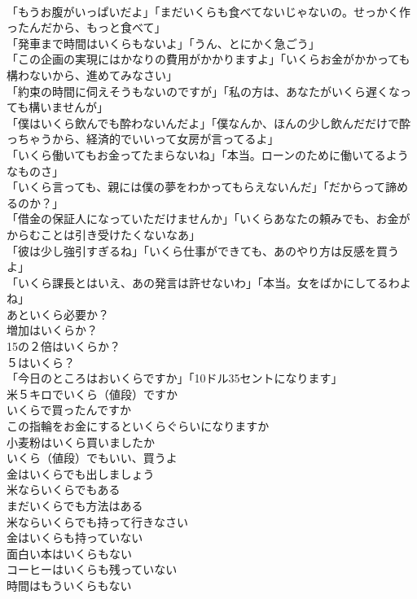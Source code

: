 \documentclass[8pt]{extreport}
\begin{document}
\begin{CJK}{UTF8}{min}
\\	「もうお腹がいっぱいだよ」「まだいくらも食べてないじゃないの。せっかく作ったんだから、もっと食べて」 
\\	「発車まで時間はいくらもないよ」「うん、とにかく急ごう」 
\\	「この企画の実現にはかなりの費用がかかりますよ」「いくらお金がかかっても構わないから、進めてみなさい」 
\\	「約束の時間に伺えそうもないのですが」「私の方は、あなたがいくら遅くなっても構いませんが」 
\\	「僕はいくら飲んでも酔わないんだよ」「僕なんか、ほんの少し飲んだだけで酔っちゃうから、経済的でいいって女房が言ってるよ」 
\\	「いくら働いてもお金ってたまらないね」「本当。ローンのために働いてるようなものさ」 
\\	「いくら言っても、親には僕の夢をわかってもらえないんだ」「だからって諦めるのか？」 
\\	「借金の保証人になっていただけませんか」「いくらあなたの頼みでも、お金がからむことは引き受けたくないなあ」 
\\	「彼は少し強引すぎるね」「いくら仕事ができても、あのやり方は反感を買うよ」 
\\	「いくら課長とはいえ、あの発言は許せないわ」「本当。女をばかにしてるわよね」 
\\	あといくら必要か？ 
\\	増加はいくらか？ 
\\	15の２倍はいくらか？ 
\\	５はいくら？ 
\\	「今日のところはおいくらですか」「10ドル35セントになります」 
\\	米５キロでいくら（値段）ですか 
\\	いくらで買ったんですか 
\\	この指輪をお金にするといくらぐらいになりますか 
\\	小麦粉はいくら買いましたか 
\\	いくら（値段）でもいい、買うよ 
\\	金はいくらでも出しましょう 
\\	米ならいくらでもある 
\\	まだいくらでも方法はある 
\\	米ならいくらでも持って行きなさい 
\\	金はいくらも持っていない 
\\	面白い本はいくらもない 
\\	コーヒーはいくらも残っていない 
\\	時間はもういくらもない 

\end{CJK}
\end{document}
